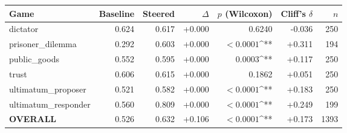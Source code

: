 \begin{tabular}{lrrrrrr}
\toprule
Game & Baseline & Steered & $\Delta$ & $p$ (Wilcoxon) & Cliff's $\delta$ & $n$ \\
\midrule
dictator & 0.624 & 0.617 & +0.000 & 0.6240 & -0.036 & 250 \\
prisoner_dilemma & 0.292 & 0.603 & +0.000 & $<0.0001$^{**} & +0.311 & 194 \\
public_goods & 0.552 & 0.595 & +0.000 & 0.0003^{**} & +0.117 & 250 \\
trust & 0.606 & 0.615 & +0.000 & 0.1862 & +0.051 & 250 \\
ultimatum_proposer & 0.521 & 0.582 & +0.000 & $<0.0001$^{**} & +0.183 & 250 \\
ultimatum_responder & 0.560 & 0.809 & +0.000 & $<0.0001$^{**} & +0.249 & 199 \\
\textbf{OVERALL} & 0.526 & 0.632 & +0.106 & $<0.0001$^{**} & +0.173 & 1393 \\
\bottomrule
\end{tabular}
